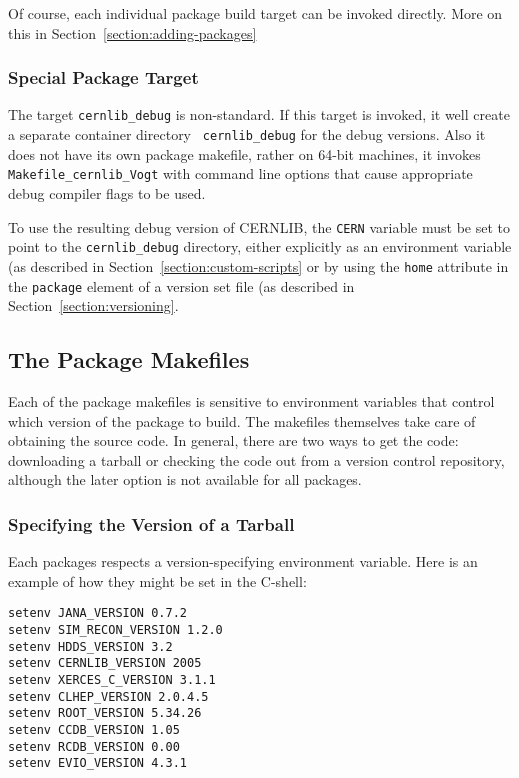 \documentclass[12pt]{article}
\begin{document}
Of course, each individual package build target can be invoked
directly. More on this in Section~\ref{section:adding-packages}

\subsubsection{Special Package Target}

The target {\tt cernlib\_debug} is non-standard. If this target is
invoked, it well create a separate container directory {\tt
  cernlib\_debug} for the debug versions. Also it does not have its
own package makefile, rather on 64-bit machines, it invokes {\tt
  Makefile\_cernlib\_Vogt} with command line options that cause
appropriate debug compiler flags to be used.

To use the resulting debug version of CERNLIB, the {\tt CERN} variable
must be set to point to the {\tt cernlib\_debug} directory, either explicitly as an environment variable (as described in Section~\ref{section:custom-scripts} or by using the {\tt home} attribute in the {\tt package} element of a version set file (as described in Section~\ref{section:versioning}.

\subsection{The Package Makefiles}\label{section:package-makefiles}

Each of the package makefiles is sensitive to environment variables
that control which version of the package to build. The makefiles
themselves take care of obtaining the source code. In general, there
are two ways to get the code: downloading a tarball or checking the
code out from a version control repository, although the later option
is not available for all packages.

\subsubsection{Specifying the Version of a Tarball}

Each packages respects a version-specifying environment variable. Here
is an example of how they might be set in the C-shell:

\begin{verbatim}
setenv JANA_VERSION 0.7.2
setenv SIM_RECON_VERSION 1.2.0
setenv HDDS_VERSION 3.2
setenv CERNLIB_VERSION 2005
setenv XERCES_C_VERSION 3.1.1
setenv CLHEP_VERSION 2.0.4.5
setenv ROOT_VERSION 5.34.26
setenv CCDB_VERSION 1.05
setenv RCDB_VERSION 0.00
setenv EVIO_VERSION 4.3.1
\end{verbatim}
\end{document}
